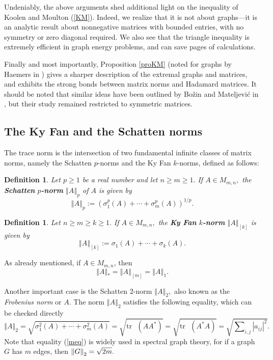 \documentclass[12pt]{article}%
\newtheorem{definition}[theorem]{Definition}
\begin{document}
Undeniably, the above arguments shed additional light on the inequality of
Koolen and Moulton (\ref{KM}). Indeed, we realize that it is not about
graphs---it is an analytic result about nonnegative matrices with bounded
entries, with no symmetry or zero diagonal required. We also see that the
triangle inequality is extremely efficient in graph energy problems, and can
save pages of calculations.

Finally and most importantly, Proposition \ref{proKM} (noted for graphs by
Haemers in \cite{Hae08}) gives a sharper description of the extremal graphs
and matrices, and exhibits the strong bonds between matrix norms and Hadamard
matrices. It should be noted that similar ideas have been outlined by
Bo\v{z}in and Mateljevi\'{c} in \cite{BoMa11}, but their study remained
restricted to symmetric matrices.

\subsection{The Ky Fan and the Schatten norms}

The trace norm is the intersection of two fundamental infinite classes of
matrix norms, namely the Schatten $p$-norms and the Ky Fan $k$-norms, defined
as follows:

\begin{definition}
Let $p\geq1$ be a real number and let $n\geq m\geq1.$ If $A\in M_{m,n},$ the
\textbf{Schatten }$p$\textbf{-norm} $\left\Vert A\right\Vert _{p}$ of $A$ is
given by%
\[
\left\Vert A\right\Vert _{p}:=\left(  \sigma_{1}^{p}\left(  A\right)
+\cdots+\sigma_{m}^{p}\left(  A\right)  \right)  ^{1/p}.
\]

\end{definition}

\begin{definition}
Let $n\geq m\geq k\geq1.$ If $A\in M_{m,n},$ the \textbf{Ky Fan }%
$k$\textbf{-norm} $\left\Vert A\right\Vert _{\left[  k\right]  }$ is given by%
\[
\left\Vert A\right\Vert _{\left[  k\right]  }:=\sigma_{1}\left(  A\right)
+\cdots+\sigma_{k}\left(  A\right)  .
\]

\end{definition}

As already mentioned, if $A\in M_{m,n}$, then
\[
\left\Vert A\right\Vert _{\ast}=\left\Vert A\right\Vert _{\left[  m\right]
}=\left\Vert A\right\Vert _{1}.
\]


Another important case is the Schatten $2$-norm $\left\Vert A\right\Vert
_{2},$ also known as the \emph{Frobenius norm} or $A.$ The norm $\left\Vert
A\right\Vert _{2}$ satisfies the following equality, which can be checked
directly%
\begin{equation}
\left\Vert A\right\Vert _{2}=\sqrt{\sigma_{1}^{2}\left(  A\right)
+\cdots+\sigma_{m}^{2}\left(  A\right)  }=\sqrt{\mathrm{tr}\text{ }\left(
AA^{\ast}\right)  }=\sqrt{\mathrm{tr}\text{ }\left(  A^{\ast}A\right)  }%
=\sqrt{\sum\nolimits_{i,j}\left\vert a_{ij}\right\vert ^{2}}. \label{meq}%
\end{equation}
Note that equality (\ref{meq}) is widely used in spectral graph theory, for if
a graph $G$ has $m$ edges, then $\left\Vert G\right\Vert _{2}=\sqrt
{2m}.\medskip$
\end{document}
